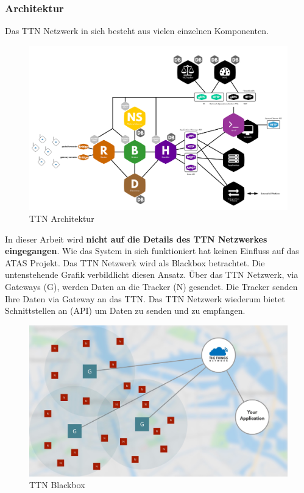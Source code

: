 \documentclass[11pt,english,german]{report}
\theoremstyle{definition}
\begin{document}
\subsubsection{Architektur}
Das TTN Netzwerk in sich besteht aus vielen einzelnen Komponenten.
\begin{figure}[H]
	\centering
	\includegraphics[width=\textwidth]{img/ttn/ttn_architecture.png}
	\caption[TTN Architektur]
	{TTN Architektur}
\end{figure}

\newpage
\noindent
In dieser Arbeit wird \textbf{nicht auf die Details des TTN Netzwerkes eingegangen}. Wie das System in sich funktioniert hat keinen Einfluss auf das ATAS Projekt. Das TTN Netzwerk wird als Blackbox betrachtet. Die untenstehende Grafik verbildlicht diesen Ansatz. Über das TTN Netzwerk, via Gateways (G), werden Daten an die Tracker (N) gesendet. Die Tracker senden Ihre Daten via Gateway an das TTN. Das TTN Netzwerk wiederum bietet Schnittstellen an (API) um Daten zu senden und zu empfangen.

\begin{figure}[H]
	\centering
	\includegraphics[width=\textwidth]{img/ttn/ttn-overview.jpg}
	\caption[TTN Blackbox]
	{TTN Blackbox}
\end{figure}
\noindent
\end{document}
